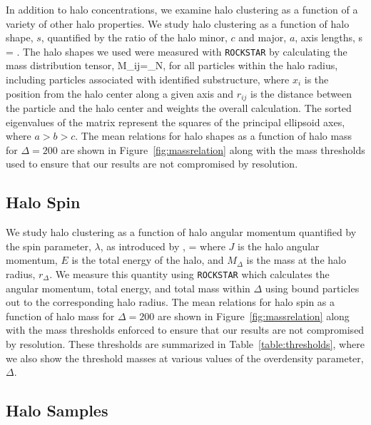 \documentclass[usenatbib,fleqn]{mnras}
\begin{document}
In addition to halo concentrations, we examine halo clustering as a function of a variety of other halo properties. We study halo clustering as a function of halo shape, $s$, quantified by the ratio of the halo minor, $c$ and major, $a$, axis lengths, 
%
\beq
s = .
\eeq
%
The halo shapes we used were measured with {\tt ROCKSTAR} by calculating the mass distribution tensor,
\beq
M_{ij}=\sum\limits_{N},
\eeq
for all particles within the halo radius, including particles associated with identified substructure, where $x_i$ is the position from the halo center along a given axis and $r_{ij}$ is the distance between the particle and the halo center and weights the overall calculation. The sorted eigenvalues of the matrix represent the squares of the principal ellipsoid axes, where $a > b > c$. The mean relations for halo shapes as a function of halo mass for $\Delta=200$ are shown in Figure~\ref{fig:massrelation} along with the mass thresholds used to ensure that our results are not compromised by 
resolution.


\subsection{Halo Spin}

We study halo clustering as a function of halo angular momentum quantified 
by the spin parameter, $\lambda$, as introduced by \citep{peebles69},
\beq
\lambda = 
\eeq
where $J$ is the halo angular momentum, $E$ is the total energy of the 
halo, and $M_{\Delta}$ is the mass at the halo radius, $r_{\Delta}$. We measure this quantity using {\tt ROCKSTAR} which calculates the angular momentum, total energy, and total mass within $\Delta$ using bound particles out to the corresponding halo radius.
The mean relations for halo spin as a function of halo mass for $\Delta=200$ are shown in Figure~\ref{fig:massrelation} along with the mass thresholds enforced to ensure that our results are not compromised by resolution. These thresholds are summarized in Table~\ref{table:thresholds}, where we also show the threshold masses at various values of the overdensity parameter, $\Delta$.

\subsection{Halo Samples}
\end{document}
